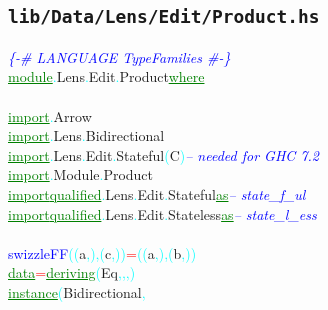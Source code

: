 \subsection{\texttt{lib/Data/Lens/Edit/Product.hs}}
\label{mod:Data.Lens.Edit.Product}
\textcolor{blue}{{\it{}\{-\# LANGUAGE TypeFamilies \#-\}}}\\\textcolor{green}{\underline{module}}\textcolor{cyan}{.}{\rm{}Lens}\textcolor{cyan}{.}{\rm{}Edit}\textcolor{cyan}{.}{\rm{}Product}\hsspace \textcolor{green}{\underline{where}}\\\\\textcolor{green}{\underline{import}}\textcolor{cyan}{.}{\rm{}Arrow}\\\textcolor{green}{\underline{import}}\textcolor{cyan}{.}{\rm{}Lens}\textcolor{cyan}{.}{\rm{}Bidirectional}\\\textcolor{green}{\underline{import}}\textcolor{cyan}{.}{\rm{}Lens}\textcolor{cyan}{.}{\rm{}Edit}\textcolor{cyan}{.}{\rm{}Stateful}\hsspace \textcolor{cyan}{(}{\rm{}C}\textcolor{cyan}{)}\hsspace \textcolor{blue}{{\it{}-- needed for GHC 7.2}}\\\textcolor{green}{\underline{import}}\textcolor{cyan}{.}{\rm{}Module}\textcolor{cyan}{.}{\rm{}Product}\\\textcolor{green}{\underline{import}}\hsspace \textcolor{green}{\underline{qualified}}\textcolor{cyan}{.}{\rm{}Lens}\textcolor{cyan}{.}{\rm{}Edit}\textcolor{cyan}{.}{\rm{}Stateful}\hsspace \hsspace \textcolor{green}{\underline{as}}\hsspace \textcolor{blue}{{\it{}-- state\_f\_ul}}\\\textcolor{green}{\underline{import}}\hsspace \textcolor{green}{\underline{qualified}}\textcolor{cyan}{.}{\rm{}Lens}\textcolor{cyan}{.}{\rm{}Edit}\textcolor{cyan}{.}{\rm{}Stateless}\hsspace \textcolor{green}{\underline{as}}\hsspace \textcolor{blue}{{\it{}-- state\_l\_ess}}\\\\\textcolor{blue}{swizzleFF}\hsspace \textcolor{cyan}{(}\textcolor{cyan}{(}{\rm{}a}\textcolor{cyan}{,}\textcolor{cyan}{)}\textcolor{cyan}{,}\hsspace \textcolor{cyan}{(}{\rm{}c}\textcolor{cyan}{,}\textcolor{cyan}{)}\textcolor{cyan}{)}\hsspace \textcolor{red}{=}\hsspace \textcolor{cyan}{(}\textcolor{cyan}{(}{\rm{}a}\textcolor{cyan}{,}\textcolor{cyan}{)}\textcolor{cyan}{,}\hsspace \textcolor{cyan}{(}{\rm{}b}\textcolor{cyan}{,}\textcolor{cyan}{)}\textcolor{cyan}{)}\\\textcolor{green}{\underline{data}}\hsspace \textcolor{red}{=}\hsspace \textcolor{green}{\underline{deriving}}\hsspace \textcolor{cyan}{(}{\rm{}Eq}\textcolor{cyan}{,}\textcolor{cyan}{,}\textcolor{cyan}{,}\textcolor{cyan}{)}\\\textcolor{green}{\underline{instance}}\hsspace \textcolor{cyan}{(}{\rm{}Bidirectional}\textcolor{cyan}{,}\hsspace 